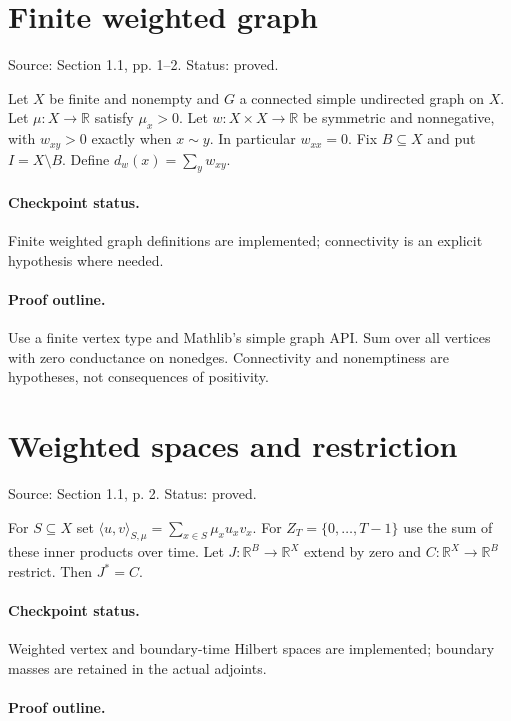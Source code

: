 \section{Finite weighted graph}
Source: Section 1.1, pp. 1–2. Status: proved.
\begin{definition}\label{weighted-graph}

Let $X$ be finite and nonempty and $G$ a connected simple undirected graph on $X$. Let $\mu:X\to\mathbb R$ satisfy $\mu_x>0$. Let $w:X\times X\to\mathbb R$ be symmetric and nonnegative, with $w_{xy}>0$ exactly when $x\sim y$. In particular $w_{xx}=0$. Fix $B\subseteq X$ and put $I=X\setminus B$. Define $d_w(x)=\sum_y w_{xy}$.


\paragraph{Checkpoint status.}
Finite weighted graph definitions are implemented; connectivity is an explicit hypothesis where needed.
\end{definition}
\paragraph{Proof outline.}

Use a finite vertex type and Mathlib's simple graph API. Sum over all vertices with zero conductance on nonedges. Connectivity and nonemptiness are hypotheses, not consequences of positivity.
\nodebreak
\section{Weighted spaces and restriction}
Source: Section 1.1, p. 2. Status: proved.
\begin{definition}\label{weighted-spaces}

For $S\subseteq X$ set $\langle u,v\rangle_{S,\mu}=\sum_{x\in S}\mu_xu_xv_x$. For $Z_T=\{0,\ldots,T-1\}$ use the sum of these inner products over time. Let $J:\mathbb R^B\to\mathbb R^X$ extend by zero and $C:\mathbb R^X\to\mathbb R^B$ restrict. Then $J^*=C$.


\paragraph{Checkpoint status.}
Weighted vertex and boundary-time Hilbert spaces are implemented; boundary masses are retained in the actual adjoints.
\end{definition}
\paragraph{Proof outline.}

